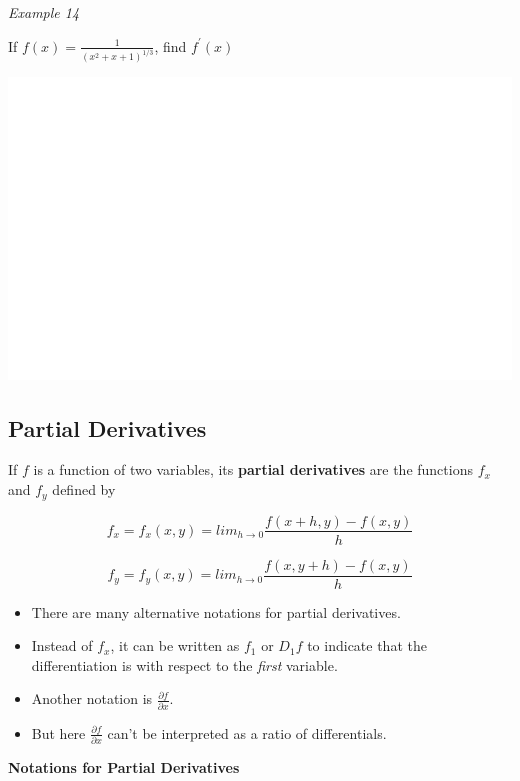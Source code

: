 \documentclass[]{book}
\begin{document}
\emph{Example 14}

If \(f(x)=\frac{1}{(x^2+x+1)^{1/3}}\), find \(f^\prime(x)\)

\begin{center}\includegraphics[width=1\linewidth]{figure/LB25-1} \end{center}

\hypertarget{partial-derivatives}{%
\subsection{Partial Derivatives}\label{partial-derivatives}}

If \(f\) is a function of two variables, its \textbf{partial derivatives} are the functions \(f_x\) and \(f_y\) defined by

\[f_x=f_x(x,y)=lim_{h\to 0}\frac{f(x+h,y)-f(x,y)}{h}\]

\[f_y=f_y(x,y)=lim_{h\to 0}\frac{f(x,y+h)-f(x,y)}{h}\]

\begin{itemize}
\item
  There are many alternative notations for partial derivatives.
\item
  Instead of \(f_x\), it can be written as \(f_1\) or \(D_1f\) to indicate that the differentiation is with respect to the \emph{first} variable.
\item
  Another notation is \(\frac{\partial f}{\partial x}\).
\item
  But here \(\frac{\partial f}{\partial x}\) can't be interpreted as a ratio of differentials.
\end{itemize}

\newpage

\textbf{Notations for Partial Derivatives}
\end{document}
